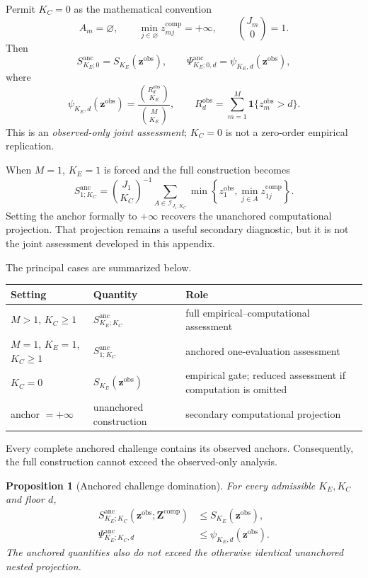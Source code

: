 \documentclass[11pt]{article}
\newcommand{\Sanc}{S^{\mathrm{anc}}}
\newcommand{\Psianc}{\Psi^{\mathrm{anc}}}
\newtheorem{proposition}{Proposition}
\theoremstyle{remark}
\begin{document}
Permit $K_C=0$ as the mathematical convention
\[
A_m=\varnothing,
\qquad
\min_{j\in\varnothing}z_{mj}^{\mathrm{comp}}=+\infty,
\qquad
\binom{J_m}{0}=1.
\]
Then
\begin{equation}
\Sanc_{K_E;0}
=S_{K_E}(\mathbf z^{\mathrm{obs}}),
\qquad
\Psianc_{K_E;0,d}
=\psi_{K_E,d}(\mathbf z^{\mathrm{obs}}),
\label{eq:observed-boundary}
\end{equation}
where
\[
\psi_{K_E,d}(\mathbf z^{\mathrm{obs}})
=
\frac{\binom{R_d^{\mathrm{obs}}}{K_E}}
{\binom{M}{K_E}},
\qquad
R_d^{\mathrm{obs}}
=
\sum_{m=1}^M\mathbf 1\{z_m^{\mathrm{obs}}>d\}.
\]
This is an \emph{observed-only joint assessment};
$K_C=0$ is not a zero-order empirical replication.

When $M=1$, $K_E=1$ is forced and the full construction becomes
\begin{equation}
\Sanc_{1;K_C}
=
\binom{J_1}{K_C}^{-1}
\sum_{A\in\mathcal I_{J_1,K_C}}
\min\left\{z_1^{\mathrm{obs}},
\min_{j\in A}z_{1j}^{\mathrm{comp}}\right\}.
\label{eq:one-evaluation-boundary}
\end{equation}
Setting the anchor formally to $+\infty$ recovers the unanchored computational
projection. That projection remains a useful secondary
diagnostic, but it is not the joint assessment developed in this appendix.

The principal cases are summarized below.
\begin{center}
\begin{tabularx}{0.96\textwidth}{@{}lX X@{}}
\toprule
Setting & Quantity & Role \\
\midrule
$M>1$, $K_C\geq1$ & $\Sanc_{K_E;K_C}$ & full empirical--computational assessment \\
$M=1$, $K_E=1$, $K_C\geq1$ & $\Sanc_{1;K_C}$ & anchored one-evaluation assessment \\
$K_C=0$ & $S_{K_E}(\mathbf z^{\mathrm{obs}})$ & empirical gate; reduced assessment if computation is omitted \\
anchor $=+\infty$ & unanchored construction & secondary computational projection \\
\bottomrule
\end{tabularx}
\end{center}

Every complete anchored challenge contains its observed anchors. Consequently,
the full construction cannot exceed the observed-only analysis.

\begin{proposition}[Anchored challenge domination]
\label{prop:anchor-domination}
For every admissible $K_E,K_C$ and floor $d$,
\begin{align}
\Sanc_{K_E;K_C}
\left(\mathbf z^{\mathrm{obs}};\mathbf Z^{\mathrm{comp}}\right)
&\leq
S_{K_E}(\mathbf z^{\mathrm{obs}}),
\label{eq:magnitude-domination}\\
\Psianc_{K_E;K_C,d}
&\leq
\psi_{K_E,d}(\mathbf z^{\mathrm{obs}}).
\label{eq:survival-domination}
\end{align}
The anchored quantities also do not exceed the otherwise identical unanchored
nested projection.
\end{proposition}
\end{document}
